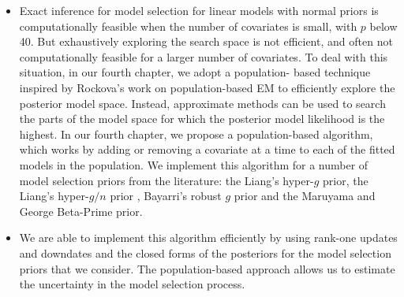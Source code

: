 \begin{itemize}
\item Exact inference for model selection for linear models with normal priors
is computationally feasible when the number of  covariates is small, with $p$
below 40. But exhaustively exploring the search space is not efficient, and
often not computationally feasible for a larger number of covariates. To deal
with this situation, in our fourth chapter, we adopt a population- based
technique inspired by Rockova's work on population-based EM to efficiently
explore the posterior model space. Instead, approximate methods can be used to
search the parts of the model space for which the posterior model likelihood is
the highest. In our fourth chapter, we propose a population-based algorithm, which
works by adding or removing a covariate at a time to each of the fitted models
in the population. We implement this algorithm for a number of model selection
priors from the literature: the Liang's hyper-$g$ prior, the Liang's hyper-$g/n$
prior \citep{Liang2008}, Bayarri's robust $g$ prior \citep{Bayarri2012} and the
Maruyama and George Beta-Prime \citep{Maruyama2011} prior.


\item We are able to implement this algorithm efficiently by using rank-one
updates and downdates and the closed forms of the posteriors for the model
selection priors that we consider. The population-based approach allows us to
estimate the uncertainty in the model selection process.

\end{itemize}
